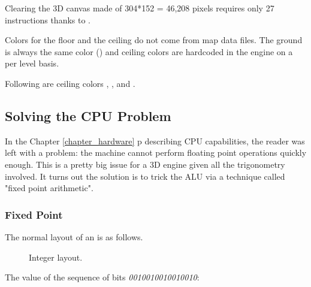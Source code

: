 \begin{minipage}{\textwidth}
 
 \end{minipage}
\par
Clearing the 3D canvas made of 304*152 = 46,208 pixels requires only 27 instructions thanks to .\\
\par
Colors for the floor and the ceiling do not come from map data files. The ground is always the same color () and ceiling colors are hardcoded in the engine on a per level basis.\\
\par
\begin{minipage}{\textwidth}
 
 \end{minipage}
\par


Following are ceiling colors , ,  and .\\ 
\par
{}












\subsection{Solving the CPU Problem}

In the Chapter \ref{chapter_hardware}  p\pageref{chapter_hardware} describing CPU capabilities, the reader was left with a problem: the machine cannot perform floating point operations quickly enough. This is a pretty big issue for a 3D engine given all the trigonometry involved. It turns out the solution is to trick the ALU via a technique called "fixed point arithmetic".







\subsubsection{Fixed Point}
The normal layout of an  is as follows.
\begin{figure}[H]
\centering
 
 \caption{Integer layout.} \label{fig:int_layout}
 \end{figure}
The value of the sequence of bits \emph{0010010010010010}:
\begin{figure}[H]
\centering

 \end{figure}

